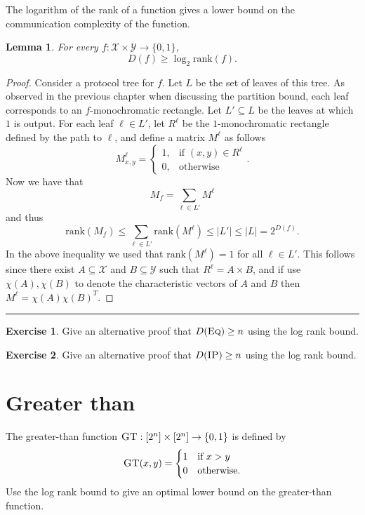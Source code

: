 \documentclass[11pt]{amsart}
\theoremstyle{plain}
\newtheorem{lemma}{Lemma}
\theoremstyle{definition}
\newtheorem{exercise}{Exercise}
\theoremstyle{plain}
\newcommand{\calX}{\mathcal{X}}
\newcommand{\calY}{\mathcal{Y}}
\newcommand{\Eq}{\textsc{Eq}}
\newcommand{\GT}{\textsc{GT}}
\newcommand{\IP}{\textsc{IP}}
\newcommand{\rank}{\mathrm{rank}}
\newcommand{\exercises}{\bigskip \noindent\rule{8cm}{0.4pt} \medskip}
\begin{document}
The logarithm of the rank of a function gives a lower bound on the communication complexity of the function.

\begin{lemma}
\label{lem:logrank}
For every $f : \calX \times \calY \to \{0,1\}$,
\[
D(f) \ge \log_2 \rank(f).
\]
\end{lemma}

\begin{proof}
Consider a protocol tree for $f$. Let $L$ be the set of leaves of this tree. As observed in the previous chapter when discussing the partition bound, each leaf corresponds to an $f$-monochromatic rectangle. Let $L'\subseteq L$ be the leaves at which $1$ is output. For each leaf $\ell \in L'$, let $R^\ell$ be the $1$-monochromatic rectangle defined by the path to $\ell$, and define a matrix $M^\ell$ as follows
$$M^\ell_{x,y} = \begin{cases}
1, &\text{if } (x,y) \in R^\ell \\
0, &\text{otherwise}
\end{cases}.$$
Now we have that
$$M_f = \sum_{\ell \in L'} M^\ell$$
and thus
$$\rank(M_f) \leq \sum_{\ell \in L'} \rank(M^\ell) \leq |L'| \leq |L| = 2^{D(f)}.$$
In the above inequality we used that $\rank(M^\ell) = 1$ for all $\ell \in L'$. This follows since there exist $A \subseteq \mathcal{X}$ and $B \subseteq \mathcal{Y}$ such that $R^\ell = A\times B$, and if use $\chi(A), \chi(B)$ to denote the characteristic vectors of $A$ and $B$ then $M^\ell = \chi(A)\chi(B)^T$.
\end{proof}

\exercises

\begin{exercise} %
Give an alternative proof that $D(\Eq) \ge n$ using the log rank bound.
\end{exercise}

\begin{exercise}
Give an alternative proof that $D(\IP) \ge n$ using the log rank bound.\end{exercise}


\newpage \section{Greater than}

The greater-than function $\GT : [2^n] \times [2^n] \to \{0,1\}$ is defined by
\[
\GT(x,y) = \begin{cases}
1 & \mbox{if } x > y \\
0 & \mbox{otherwise.}
\end{cases}
\]
Use the log rank bound to give an optimal lower bound on the greater-than function.
\end{document}
